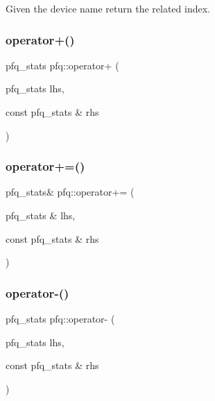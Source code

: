 Given the device name return the related index. 

\mbox{\label{namespacepfq_a1db1dc5635be457a7ca4cd9148ceae19}} 
\subsubsection{\texorpdfstring{operator+()}{operator+()}}
{\footnotesize\ttfamily pfq\+\_\+stats pfq\+::operator+ (\begin{DoxyParamCaption}\item[{pfq\+\_\+stats}]{lhs,  }\item[{const pfq\+\_\+stats \&}]{rhs }\end{DoxyParamCaption})\hspace{0.3cm}{\ttfamily [inline]}}

\mbox{\label{namespacepfq_ae140b453ea425ae677dfbc69a51370f8}} 
\subsubsection{\texorpdfstring{operator+=()}{operator+=()}}
{\footnotesize\ttfamily pfq\+\_\+stats\& pfq\+::operator+= (\begin{DoxyParamCaption}\item[{pfq\+\_\+stats \&}]{lhs,  }\item[{const pfq\+\_\+stats \&}]{rhs }\end{DoxyParamCaption})\hspace{0.3cm}{\ttfamily [inline]}}

\mbox{\label{namespacepfq_ad01713142f8fa670ff8614b9f2bab3b8}} 
\subsubsection{\texorpdfstring{operator-\/()}{operator-()}}
{\footnotesize\ttfamily pfq\+\_\+stats pfq\+::operator-\/ (\begin{DoxyParamCaption}\item[{pfq\+\_\+stats}]{lhs,  }\item[{const pfq\+\_\+stats \&}]{rhs }\end{DoxyParamCaption})\hspace{0.3cm}{\ttfamily [inline]}}


